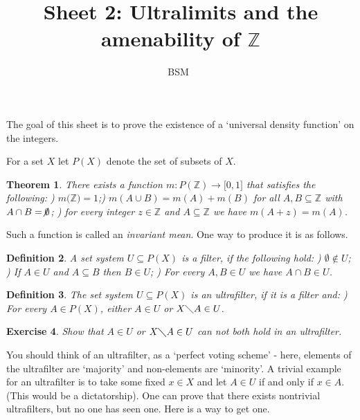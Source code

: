 \documentclass[12pt]{article}
\newtheorem{theorem}{Theorem}
\newtheorem{definition}[theorem]{Definition}
\newtheorem{exercise}[theorem]{Exercise}
\begin{document}
\title{Sheet 2: Ultralimits and the amenability of $\mathbb{Z}$ }
\author{BSM\ }
\date{}
\maketitle

The goal of this sheet is to prove the existence of a `universal density
function' on the integers. \bigskip

For a set $X$ let $P(X)$ denote the set of subsets of $X$.

\begin{theorem}
There exists a function $m:P(\mathbb{Z})\rightarrow\lbrack0,1]$ that
satisfies the following: ) $m(\mathbb{Z)}=1$;) $m(A\cup B)=m(A)+m(B)$ for all $A,B\subseteq\mathbb{Z}$ with $A\cap
B=\not \emptyset $; ) for every integer $z\in\mathbb{Z}$ and $A\subseteq\mathbb{Z}$ we have $%
m(A+z)=m(A)$.
\end{theorem}

Such a function is called an \emph{invariant mean}. One way to produce it is
as follows.

\begin{definition}
A set system $U\subseteq P(X)$ is a \emph{filter}, if the following hold: 
) $\emptyset\notin U$; ) If $A\in U$ and $A\subseteq B$ then $B\in U$; ) For every $A,B\in U$ we have $A\cap B\in U$.
\end{definition}

\begin{definition}
The set system $U\subseteq P(X)$ is an \emph{ultrafilter}, if it is a filter
and: ) For every $A\in P(X)$, either $A\in U$ or $X\diagdown A\in U$.
\end{definition}

\begin{exercise}
Show that $A\in U$ or $X\diagdown A\in U$ can not both hold in an
ultrafilter.
\end{exercise}

You should think of an ultrafilter, as a `perfect voting scheme' - here,
elements of the ultrafilter are `majority' and non-elements are `minority'.
A trivial example for an ultrafilter is to take some fixed $x\in X$ and let $%
A\in U$ if and only if $x\in A$. (This would be a dictatorship). One can
prove that there exists nontrivial ultrafilters, but no one has seen one.
Here is a way to get one.
\end{document}
